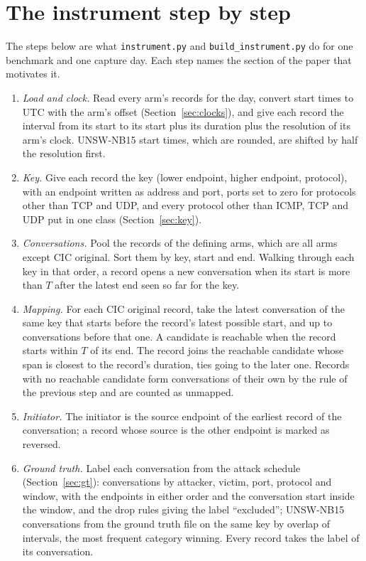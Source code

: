 \renewcommand{\theHtable}{app.\thetable}%
\section{The instrument step by step}\label{app:instrument}

The steps below are what \texttt{instrument.py} and \texttt{build\_instrument.py} do for one benchmark and one capture day. Each step names the section of the paper that motivates it.

\begin{enumerate}
\item \emph{Load and clock.} Read every arm's records for the day, convert start times to UTC with the arm's offset (Section~\ref{sec:clocks}), and give each record the interval from its start to its start plus its duration plus the resolution of its arm's clock. UNSW-NB15 start times, which are rounded, are shifted by half the resolution first.
\item \emph{Key.} Give each record the key (lower endpoint, higher endpoint, protocol), with an endpoint written as address and port, ports set to zero for protocols other than TCP and UDP, and every protocol other than ICMP, TCP and UDP put in one class (Section~\ref{sec:key}).
\item \emph{Conversations.} Pool the records of the defining arms, which are all arms except CIC original. Sort them by key, start and end. Walking through each key in that order, a record opens a new conversation when its start is more than $T$ after the latest end seen so far for the key.
\item \emph{Mapping.} For each CIC original record, take the latest conversation of the same key that starts before the record's latest possible start, and up to  conversations before that one. A candidate is reachable when the record starts within $T$ of its end. The record joins the reachable candidate whose span is closest to the record's duration, ties going to the later one. Records with no reachable candidate form conversations of their own by the rule of the previous step and are counted as unmapped.
\item \emph{Initiator.} The initiator is the source endpoint of the earliest record of the conversation; a record whose source is the other endpoint is marked as reversed.
\item \emph{Ground truth.} Label each conversation from the attack schedule (Section~\ref{sec:gt}): \cicids{} conversations by attacker, victim, port, protocol and window, with the endpoints in either order and the conversation start inside the window, and the drop rules giving the label ``excluded''; UNSW-NB15 conversations from the ground truth file on the same key by overlap of intervals, the most frequent category winning. Every record takes the label of its conversation.

\end{enumerate}
